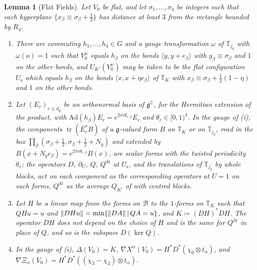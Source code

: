 \documentclass[11pt]{preprint}
\newcommand{\tr}{\operatorname{tr}}
\DeclarePairedDelimiter{\norm}{\lVert}{\rVert}
\numberwithin{equation}{section}
\newtheorem{lemma}[theorem]{Lemma}
\theoremstyle{definition}
\theoremstyle{remark}
\theoremstyle{plain}
\begin{document}
\begin{lemma}[Flat Fields]\label{lem:flat-fields}
Let $V_0$ be flat, and let $\sigma_1, \dots, \sigma_4$ be integers such that each hyperplane $\{ x_\beta \equiv \sigma_\beta + \frac12 \}$ has distance at least $3$ from the rectangle bounded by $R_4$.
\begin{enumerate}[label=(\roman*)]
\item There are commuting $h_1, \dots, h_4 \in G$ and a gauge transformation $\omega$ of $\mathbb T_{j_q}$ with $\omega(o) = 1$ such that $V_0^\omega$ equals $h_\beta$ on the bonds $\langle y, y + e_\beta\rangle$ with $y_\beta \equiv \sigma_\beta$ and $1$ on the other bonds, and $U_{K'}(V_0^\omega)$ may be taken to be the flat configuration $U_{\mathrm s}$ which equals $h_\beta$ on the bonds $\langle x, x + \eta e_\beta\rangle$ of $\mathbb T_K$ with $x_\beta \equiv \sigma_\beta + \frac12(1 - \eta)$ and $1$ on the other bonds.
\item Let $(E_r)_{r \leq d_{\mathfrak g}}$ be an orthonormal basis of $\mathfrak g^{\mathbb C}$, for the Hermitian extension of the product, with $\mathrm{Ad}(h_\beta)E_r = e^{2\pi i\theta_{r,\beta}}E_r$ and $\theta_r \in [0, 1)^4$. In the gauge of (i), the components $\tr(E_r^*B)$ of a $\mathfrak g$-valued form $B$ on $\mathbb T_K$ or on $\mathbb T_{j_q}$, read in the box $\prod_\beta(\sigma_\beta + \frac12, \sigma_\beta + \frac12 + N_q)$ and extended by $B(x + N_qe_\beta) = e^{2\pi i\theta_{r,\beta}}B(x)$, are scalar forms with the twisted periodicity $\theta_r$; the operators $D$, $\partial_U$, $Q$, $Q^{\mathrm{dr}}$ at $U_{\mathrm s}$, and the translations of $\mathbb T_{j_q}$ by whole blocks, act on each component as the corresponding operators at $U = 1$ on such forms, $Q^{\mathrm{dr}}$ as the average $Q_{K'}$ of \cite[(1.18), p.~20]{BalabanPRT1} with centred blocks.
\item Let $H$ be a linear map from the forms on $\mathcal B$ to the $1$-forms on $\mathbb T_K$ such that $QHu = u$ and $\norm{DHu} = \min\{ \norm{DA} \,|\, QA = u \}$, and $K \coloneqq (DH)^*DH$. The operator $DH$ does not depend on the choice of $H$ and is the same for $Q^{\mathrm{dr}}$ in place of $Q$, and so is the subspace $D(\ker Q)$.
\item In the gauge of (i), $\Delta(V_0) = K$, $\nabla X^\alpha(V_0) = H^*D^*(\chi_0 \otimes t_\alpha)$, and $\nabla\Xi_\alpha(V_0) = H^*D^*((\chi_3 - \chi_2) \otimes t_\alpha)$.
\end{enumerate}
\end{lemma}
\end{document}
